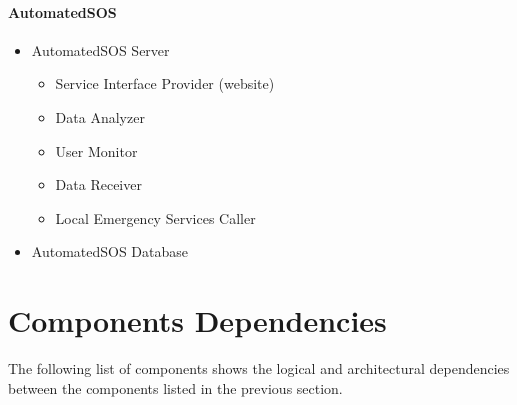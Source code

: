 \documentclass[../DD.tex]{subfiles}
\begin{document}
\paragraph{AutomatedSOS}
\begin{itemize}
	\item{AutomatedSOS Server}
	\begin{itemize}
		\item{Service Interface Provider (website)}
		\item{Data Analyzer}
		\item{User Monitor}
		\item{Data Receiver}
		\item{Local Emergency Services Caller}
	\end{itemize}
	\item{AutomatedSOS Database}
\end{itemize}

\section{Components Dependencies}
The following list of components shows the logical and architectural dependencies between the components listed in the previous section.
\end{document}
